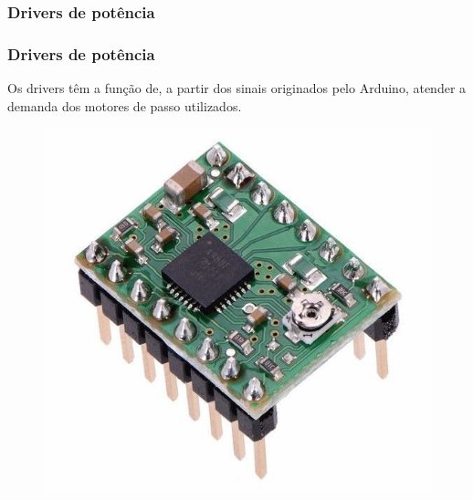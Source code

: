 \subsubsection{Drivers de potência}

\begin{frame}
\frametitle{Drivers de potência}

Os drivers têm a função de, a partir dos sinais originados pelo Arduino, atender a demanda dos motores de passo utilizados.

\begin{figure}
\centering
\includegraphics[scale = 0.2]{figuras/driver}
\end{figure}

\end{frame}
